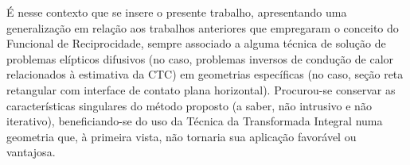 É nesse contexto que se insere o presente trabalho, apresentando uma generalização em relação aos trabalhos anteriores que empregaram o conceito do Funcional de Reciprocidade, sempre associado a alguma técnica de solução de problemas elípticos difusivos (no caso, problemas inversos de condução de calor relacionados à estimativa da CTC) em geometrias específicas (no caso, seção reta retangular com interface de contato plana horizontal). Procurou-se conservar as características singulares do método proposto (a saber, não intrusivo e não iterativo), beneficiando-se do uso da Técnica da Transformada Integral numa geometria que, à primeira vista, não tornaria sua aplicação favorável ou vantajosa.

